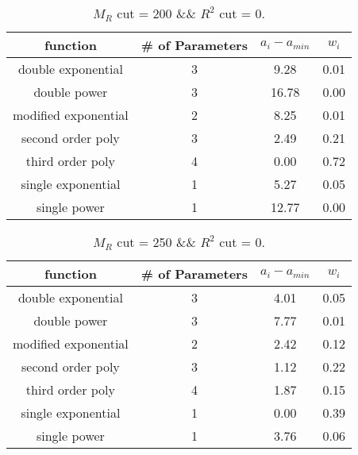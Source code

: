  
\begin{table}[H] 
\begin{center} 
\begin{tabular}{|c|c|c|c|} 
\hline function & \# of Parameters & $a_i-a_{min}$ & $w_i$ \\ \hline 
double exponential &  3 &   9.28 &   0.01 \\ 
double power &  3 &  16.78 &   0.00 \\ 
modified exponential &  2 &   8.25 &   0.01 \\ 
second order poly &  3 &   2.49 &   0.21 \\ 
third order poly &  4 &   0.00 &   0.72 \\ 
single exponential &  1 &   5.27 &   0.05 \\ 
single power &  1 &  12.77 &   0.00 \\ 
\hline 
\end{tabular} 
\caption{$M_R$ cut = 200 \&\& $R^2$ cut = 0.} 
\label{tab:FitChoices_200_0} 
\end{center} 
\end{table} 
 
 
\begin{table}[H] 
\begin{center} 
\begin{tabular}{|c|c|c|c|} 
\hline function & \# of Parameters & $a_i-a_{min}$ & $w_i$ \\ \hline 
double exponential &  3 &   4.01 &   0.05 \\ 
double power &  3 &   7.77 &   0.01 \\ 
modified exponential &  2 &   2.42 &   0.12 \\ 
second order poly &  3 &   1.12 &   0.22 \\ 
third order poly &  4 &   1.87 &   0.15 \\ 
single exponential &  1 &   0.00 &   0.39 \\ 
single power &  1 &   3.76 &   0.06 \\ 
\hline 
\end{tabular} 
\caption{$M_R$ cut = 250 \&\& $R^2$ cut = 0.} 
\label{tab:FitChoices_250_0} 
\end{center} 
\end{table} 
 
